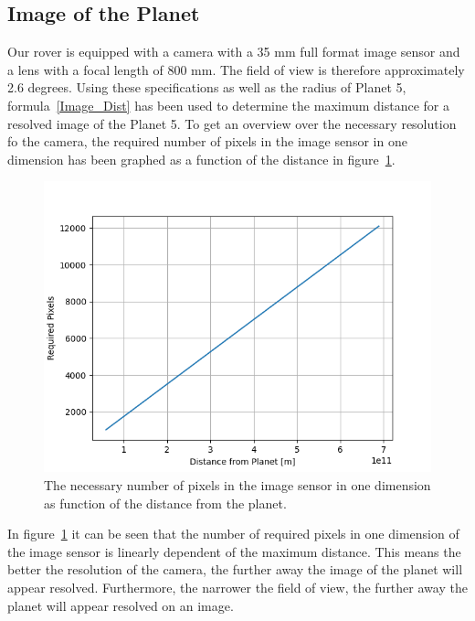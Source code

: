 \documentclass[reprint,english,notitlepage]{revtex4-2}
\begin{document}
\subsection{Image of the Planet}\label{subsec:image-of-the-planet}
	Our rover is equipped with a camera with a 35 mm full format image sensor and a lens with a focal length of 800 mm.
	The field of view is therefore approximately 2.6 degrees.
	Using these specifications as well as the radius of Planet 5, formula~\eqref{Image_Dist} has been used to determine the maximum distance for a resolved image of the Planet 5.
	To get an overview over the necessary resolution fo the camera, the required number of pixels in the image sensor in one dimension has been graphed as a function of the distance in figure~\ref{fig:Res_pixels}.

	\begin{figure}[h]
		\centering
		\includegraphics[scale=0.4]{Figures/Res_pixels}
		\caption{The necessary number of pixels in the image sensor in one dimension as function of the distance from the planet.}\label{fig:Res_pixels}
	\end{figure}

	In figure~\ref{fig:Res_pixels} it can be seen that the number of required pixels in one dimension of the image sensor is linearly dependent of the maximum distance.
	This means the better the resolution of the camera, the further away the image of the planet will appear resolved.
	Furthermore, the narrower the field of view, the further away the planet will appear resolved on an image.
\end{document}
